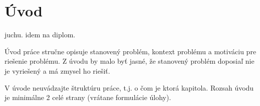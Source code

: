 

\chapter*{Úvod}\label{ch:introduction}


juchu. idem na diplom.

Úvod práce stručne opisuje stanovený problém, kontext problému a motiváciu pre riešenie problému. Z úvodu by malo byť jasné, že stanovený problém doposiaľ nie je vyriešený a má zmysel ho riešiť.

V úvode neuvádzajte štruktúru práce, t.j. o čom je ktorá kapitola. Rozsah úvodu je minimálne 2 celé strany (vrátane formulácie úlohy).
